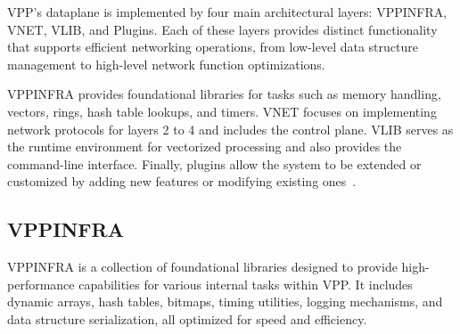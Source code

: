 VPP’s dataplane is implemented by four main architectural layers: VPPINFRA, VNET, VLIB, and Plugins. 
Each of these layers provides distinct functionality that supports efficient networking operations, from low-level data structure management to high-level network function optimizations.

VPPINFRA provides foundational libraries for tasks such as memory handling, vectors, rings, hash table lookups, and timers. 
VNET focuses on implementing network protocols for layers 2 to 4 and includes the control plane. 
VLIB serves as the runtime environment for vectorized processing and also provides the command-line interface. 
Finally, plugins allow the system to be extended or customized by adding new features or modifying existing ones~\cite{fdio-vpp-softwarearchitecture-2506}.

\subsection{VPPINFRA}
VPPINFRA is a collection of foundational libraries designed to provide high-performance capabilities for various internal tasks within VPP. 
It includes dynamic arrays, hash tables, bitmaps, timing utilities, logging mechanisms, and data structure serialization, all optimized for speed and efficiency.~\cite{fdio-vpp-infrastructure-2506}

